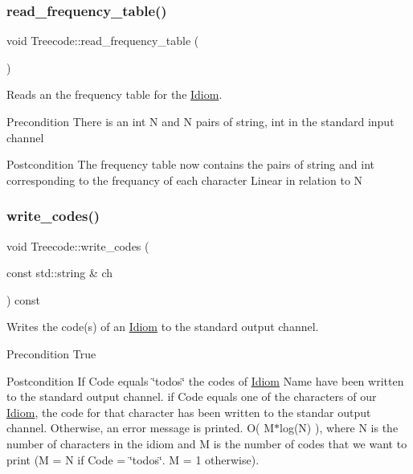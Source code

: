 \subsubsection{\texorpdfstring{read\+\_\+frequency\+\_\+table()}{read\_frequency\_table()}}
{\footnotesize\ttfamily void Treecode\+::read\+\_\+frequency\+\_\+table (\begin{DoxyParamCaption}{ }\end{DoxyParamCaption})}



Reads an the frequency table for the \hyperlink{classIdiom}{Idiom}. 

\begin{DoxyPrecond}{Precondition}
There is an int N and N pairs of string, int in the standard input channel 
\end{DoxyPrecond}
\begin{DoxyPostcond}{Postcondition}
The frequency table now contains the pairs of string and int corresponding to the frequancy of each character  Linear in relation to N 
\end{DoxyPostcond}
\mbox{\label{classTreecode_a703ddb41f7d2260b54808e0293104502}} 
\subsubsection{\texorpdfstring{write\+\_\+codes()}{write\_codes()}}
{\footnotesize\ttfamily void Treecode\+::write\+\_\+codes (\begin{DoxyParamCaption}\item[{const std\+::string \&}]{ch }\end{DoxyParamCaption}) const}



Writes the code(s) of an \hyperlink{classIdiom}{Idiom} to the standard output channel. 

\begin{DoxyPrecond}{Precondition}
True 
\end{DoxyPrecond}
\begin{DoxyPostcond}{Postcondition}
If Code equals \char`\"{}todos\char`\"{} the codes of \hyperlink{classIdiom}{Idiom} Name have been written to the standard output channel. if Code equals one of the characters of our \hyperlink{classIdiom}{Idiom}, the code for that character has been written to the standar output channel. Otherwise, an error message is printed.  O( M$\ast$log(\+N) ), where N is the number of characters in the idiom and M is the number of codes that we want to print (M = N if Code = \char`\"{}todos\char`\"{}. M = 1 otherwise). 
\end{DoxyPostcond}
\mbox{\label{classTreecode_a3f69c17073356f2bbc8ce274c3583c2c}} 
